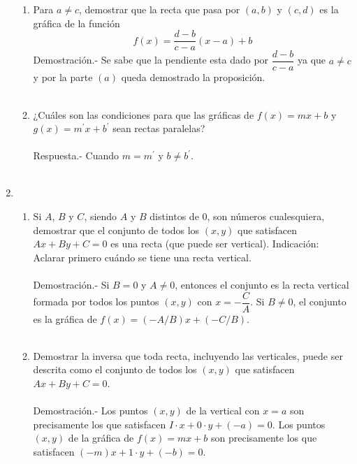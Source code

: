 \begin{enumerate}
\begin{enumerate}[\bfseries (a)]
	\item Para $a\neq c$, demostrar que la recta que pasa por $(a,b)$ y $(c,d)$ es la gráfica de la función $$f(x)=\dfrac{d-b}{c-a}(x-a)+b$$
	    Demostración.-\; Se sabe que la pendiente esta dado por $\dfrac{d-b}{c-a}$  ya que $a\neq c$ y por la parte $(a)$ queda demostrado la proposición.\\\\
	
	\item ¿Cuáles son las condiciones para que las gráficas de $f(x)=mx+b$ y $g(x)=m^{'} x + b^{'}$ sean rectas paralelas?\\\\
	    Respuesta.-\; Cuando $m=m^{'}$ y $b\neq b^{'}$.\\\\

    \end{enumerate}

    \item 
    \begin{enumerate}[\bfseries (a)]

	\item Si $A$, $B$ y $C$, siendo $A$ y $B$ distintos de $0$, son números cualesquiera, demostrar que el conjunto de todos los $(x,y)$ que satisfacen $Ax+By+C=0$ es una recta (que puede ser vertical). Indicación: Aclarar primero cuándo se tiene una recta vertical.\\\\
	    Demostración.-\; Si $B=0$ y $A\neq 0$, entonces el conjunto es la recta vertical formada por todos los puntos $(x,y)$ con $x=-\dfrac{C}{A}$. Si $B\neq 0$, el conjunto es la gráfica de $f(x)=(-A/B)x + (-C/B)$.\\\\ 

	\item Demostrar la inversa que toda recta, incluyendo las verticales, puede ser descrita como el conjunto de todos los $(x,y)$ que satisfacen $Ax + By + C =0$.\\\\
	    Demostración.-\; Los puntos $(x,y)$ de la vertical con $x=a$ son precisamente los que satisfacen $I\cdot x + 0\cdot y + (-a) = 0$. Los puntos $(x,y)$ de la gráfica de $f(x)=mx+b$ son precisamente los que satisfacen $(-m)x + 1\cdot y + (-b)=0$.\\\\
    \end{enumerate}


\end{enumerate}
